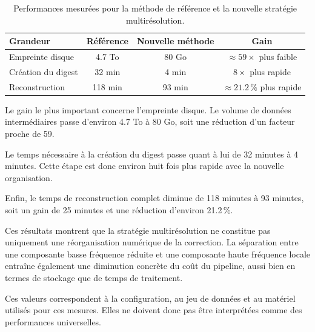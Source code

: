 \documentclass[11pt,a4paper]{report}
\begin{document}
\begin{table}[H]
\centering

\caption{Performances mesurées pour la méthode de référence et la nouvelle
stratégie multirésolution.}

\label{tab:performance}

\begin{tabular}{lccc}
\toprule

\textbf{Grandeur}
&
\textbf{Référence}
&
\textbf{Nouvelle méthode}
&
\textbf{Gain}
\\

\midrule

Empreinte disque
&
4.7 To
&
80 Go
&
$\approx 59\times$ plus faible
\\

Création du digest
&
32 min
&
4 min
&
$8\times$ plus rapide
\\

Reconstruction
&
118 min
&
93 min
&
$\approx 21.2\,\%$ plus rapide
\\

\bottomrule
\end{tabular}

\end{table}

Le gain le plus important concerne l'empreinte disque. Le volume de données
intermédiaires passe d'environ 4.7 To à 80 Go, soit une réduction d'un
facteur proche de 59.

Le temps nécessaire à la création du digest passe quant à lui de
32 minutes à 4 minutes. Cette étape est donc environ huit fois plus rapide
avec la nouvelle organisation.

Enfin, le temps de reconstruction complet diminue de 118 minutes à
93 minutes, soit un gain de 25 minutes et une réduction d'environ
21.2\,\%.

Ces résultats montrent que la stratégie multirésolution ne constitue pas
uniquement une réorganisation numérique de la correction. La séparation
entre une composante basse fréquence réduite et une composante haute
fréquence locale entraîne également une diminution concrète du coût du
pipeline, aussi bien en termes de stockage que de temps de traitement.

Ces valeurs correspondent à la configuration, au jeu de données et au
matériel utilisés pour ces mesures. Elles ne doivent donc pas être
interprétées comme des performances universelles.


\end{document}
